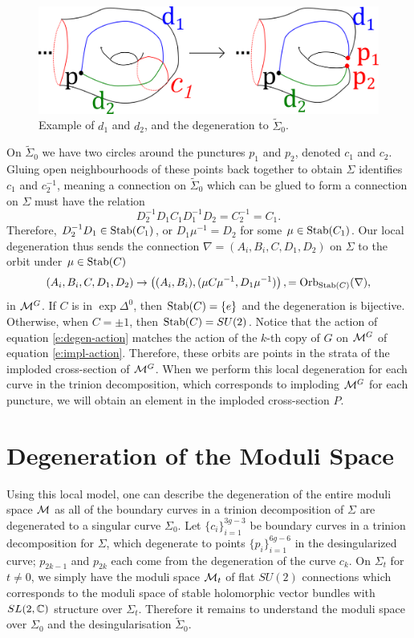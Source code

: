 	\begin{figure}
		\centering
		\includegraphics[width=0.8\linewidth]{d1d2_degen.png}
		\caption{Example of $d_1$ and $d_2$, and the degeneration to $\tilde{\Sigma}_0$.}
	\end{figure}
	On $\tilde{\Sigma}_0$ we have two circles around the punctures $p_1$ and $p_2$, denoted $c_1$ and $c_2$. Gluing open neighbourhoods of these points back together to obtain $\Sigma$ identifies $c_1$ and $c_2^{-1}$, meaning a connection on $\tilde{\Sigma}_0$ which can be glued to form a connection on $\Sigma$ must have the relation
	\begin{equation}
	D_2^{-1}D_1C_1D_1^{-1}D_2 = C_2^{-1} = C_1.
	\end{equation}
	Therefore, $D_2^{-1}D_1 \in \text{Stab}(C_1)$, or $D_1\mu^{-1} = D_2$ for some $\mu\in \text{Stab}(C_1)$. Our local degeneration thus sends the connection $\nabla = (A_i,B_i,C,D_1,D_2)$ on $\Sigma$ to the orbit under $\mu \in \text{Stab}(C)$
	\begin{equation}
		\label{e:degen-action}
		(A_i,B_i,C,D_1,D_2) \to \left(
		(A_i,B_i), (\mu C \mu^{-1}, D_1\mu^{-1})\right), 
		= \text{Orb}_{\text{Stab} (C)} (\nabla),
	\end{equation}
	in $\mathcal{M}^G$. If $C$ is in $\exp \Delta^0$, then $\text{Stab}(C) = \{e\}$ and the degeneration is bijective. Otherwise, when $C = \pm 1$, then $\text{Stab}(C) = SU(2)$. Notice that the action of equation \ref{e:degen-action} matches the action of the $k$-th copy of $G$ on $\mathcal{M}^G$ of equation \ref{e:impl-action}. Therefore, these orbits are points in the strata of the imploded cross-section of $\mathcal{M}^G$. When we perform this local degeneration for each curve in the trinion decomposition, which corresponds to imploding $\mathcal{M}^G$ for each puncture, we will obtain an element in the imploded cross-section $P$. 
 	
\section{Degeneration of the Moduli Space}
	Using this local model, one can describe the degeneration of the entire moduli space $\mathcal{M}$ as all of the boundary curves in a trinion decomposition of $\Sigma$ are degenerated to a singular curve $\Sigma_0$. Let $\{c_i\}_{i=1}^{3g-3}$ be boundary curves in a trinion decomposition for $\Sigma$, which degenerate to points $\{p_i\}_{i=1}^{6g-6}$ in the desingularized curve; $p_{2k-1}$ and $p_{2k}$ each come from the degeneration of the curve $c_k$. On $\Sigma_t$ for $t\neq 0$, we simply have the moduli space $\mathcal{M}_t$ of flat $SU(2)$ connections which corresponds to the moduli space of stable holomorphic vector bundles with $SL(2,\mathbb{C})$ structure over $\Sigma_t$. Therefore it remains to understand the moduli space over $\Sigma_0$ and the desingularisation $\tilde{\Sigma}_0$. 
	
